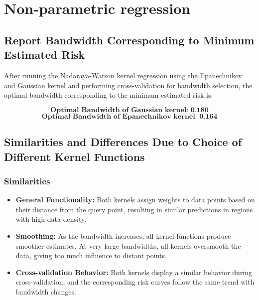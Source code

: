 \section{Non-parametric regression}

\subsection{Report Bandwidth Corresponding to Minimum Estimated Risk}

After running the Nadaraya-Watson kernel regression using the Epanechnikov and Gaussian kernel and performing cross-validation for bandwidth selection, the optimal bandwidth corresponding to the minimum estimated risk is:

\[
	\textbf{Optimal Bandwidth of Gaussian kernel: 0.180}
\]
\[
	\textbf{Optimal Bandwidth of Epanechnikov kernel: 0.164}
\]

\subsection{Similarities and Differences Due to Choice of Different Kernel Functions}

\subsubsection{Similarities}
\begin{itemize}
	\item \textbf{General Functionality:} Both kernels assign weights to
	      data points based on their distance from the query point, resulting
	      in similar predictions in regions with high data density.
	\item \textbf{Smoothing:} As the bandwidth increases, all kernel
	      functions produce smoother estimates. At very large bandwidths, all
	      kernels oversmooth the data, giving too much influence to distant
	      points.
	\item \textbf{Cross-validation Behavior:} Both kernels display a
	      similar behavior during cross-validation, and the corresponding
	      risk curves follow the same trend with bandwidth changes.
\end{itemize}

